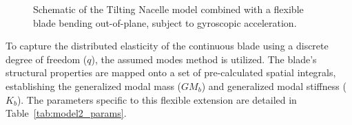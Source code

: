 \documentclass[final,onecolumn]{IEEEtran}
\begin{document}
\begin{figure}[H]
    \caption{Schematic of the Tilting Nacelle model combined with a flexible blade bending out-of-plane, subject to gyroscopic acceleration.}
    \label{fig:tilting_nacelle_flex_blade}
\end{figure}

To capture the distributed elasticity of the continuous blade using a discrete degree of freedom ($q$), the assumed modes method is utilized. The blade's structural properties are mapped onto a set of pre-calculated spatial integrals, establishing the generalized modal mass ($GM_b$) and generalized modal stiffness ($K_b$). The parameters specific to this flexible extension are detailed in Table~\ref{tab:model2_params}.
\end{document}
